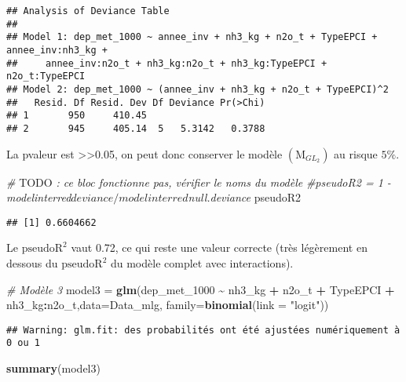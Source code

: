 \documentclass[
]{article}
\newenvironment{Shaded}{\begin{snugshade}}{\end{snugshade}}
\newcommand{\AlertTok}[1]{\textcolor[rgb]{0.94,0.16,0.16}{#1}}
\newcommand{\AttributeTok}[1]{\textcolor[rgb]{0.13,0.29,0.53}{#1}}
\newcommand{\CommentTok}[1]{\textcolor[rgb]{0.56,0.35,0.01}{\textit{#1}}}
\newcommand{\FunctionTok}[1]{\textcolor[rgb]{0.13,0.29,0.53}{\textbf{#1}}}
\newcommand{\NormalTok}[1]{#1}
\newcommand{\OtherTok}[1]{\textcolor[rgb]{0.56,0.35,0.01}{#1}}
\newcommand{\SpecialCharTok}[1]{\textcolor[rgb]{0.81,0.36,0.00}{\textbf{#1}}}
\newcommand{\StringTok}[1]{\textcolor[rgb]{0.31,0.60,0.02}{#1}}
\begin{document}
\begin{verbatim}
## Analysis of Deviance Table
## 
## Model 1: dep_met_1000 ~ annee_inv + nh3_kg + n2o_t + TypeEPCI + annee_inv:nh3_kg + 
##     annee_inv:n2o_t + nh3_kg:n2o_t + nh3_kg:TypeEPCI + n2o_t:TypeEPCI
## Model 2: dep_met_1000 ~ (annee_inv + nh3_kg + n2o_t + TypeEPCI)^2
##   Resid. Df Resid. Dev Df Deviance Pr(>Chi)
## 1       950     410.45                     
## 2       945     405.14  5   5.3142   0.3788
\end{verbatim}

La pvaleur est \textgreater\textgreater0.05, on peut donc conserver le
modèle \((\text{M}_{GL_{2}})\) au risque \(5\%\).

\begin{Shaded}
\begin{Highlighting}[]
\CommentTok{\# }\AlertTok{TODO}\CommentTok{ : ce bloc fonctionne pas, vérifier le noms du modèle}
\CommentTok{\#pseudoR2 = 1 {-} modelinterred$deviance/modelinterred$null.deviance}
\NormalTok{pseudoR2}
\end{Highlighting}
\end{Shaded}

\begin{verbatim}
## [1] 0.6604662
\end{verbatim}

Le \(\text{pseudoR}^2\) vaut 0.72, ce qui reste une valeur correcte
(très légèrement en dessous du \(\text{pseudoR}^2\) du modèle complet
avec interactions).

\begin{Shaded}
\begin{Highlighting}[]
\CommentTok{\# Modèle 3}
\NormalTok{model3 }\OtherTok{=} \FunctionTok{glm}\NormalTok{(dep\_met\_1000 }\SpecialCharTok{\textasciitilde{}}\NormalTok{ nh3\_kg }\SpecialCharTok{+}\NormalTok{ n2o\_t }\SpecialCharTok{+}\NormalTok{ TypeEPCI }\SpecialCharTok{+}\NormalTok{ nh3\_kg}\SpecialCharTok{:}\NormalTok{n2o\_t,}\AttributeTok{data=}\NormalTok{Data\_mlg, }\AttributeTok{family=}\FunctionTok{binomial}\NormalTok{(}\AttributeTok{link =} \StringTok{"logit"}\NormalTok{))}
\end{Highlighting}
\end{Shaded}

\begin{verbatim}
## Warning: glm.fit: des probabilités ont été ajustées numériquement à 0 ou 1
\end{verbatim}

\begin{Shaded}
\begin{Highlighting}[]
\FunctionTok{summary}\NormalTok{(model3)}
\end{Highlighting}
\end{Shaded}
\end{document}
